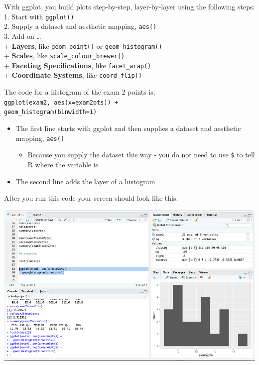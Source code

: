 \documentclass[
]{book}
\providecommand{\tightlist}{%
  \setlength{\itemsep}{0pt}\setlength{\parskip}{0pt}}
\begin{document}
With ggplot, you build plots step-by-step, layer-by-layer using the following steps:\\
1. Start with \texttt{ggplot()}\\
2. Supply a dataset and aesthetic mapping, \texttt{aes()}\\
3. Add on \ldots{}\\
+ \textbf{Layers}, like \texttt{geom\_point()} or \texttt{geom\_histogram()}\\
+ \textbf{Scales}, like \texttt{scale\_colour\_brewer()}\\
+ \textbf{Faceting Specifications}, like \texttt{facet\_wrap()}\\
+ \textbf{Coordinate Systems}, like \texttt{coord\_flip()}

The code for a histogram of the exam 2 points is:\\
\texttt{ggplot(exam2,\ aes(x=exam2pts))\ +}~\\
\texttt{geom\_histogram(binwidth=1)}

\begin{itemize}
\tightlist
\item
  The first line starts with ggplot and then supplies a dataset and aesthetic mapping, \texttt{aes()}

  \begin{itemize}
  \tightlist
  \item
    Because you supply the dataset this way - you do not need to use \texttt{\$} to tell R where the variable is\\
  \end{itemize}
\item
  The second line adds the layer of a histogram
\end{itemize}

After you run this code your screen should look like this:

\includegraphics{img/tidyhist.png}
\end{document}
